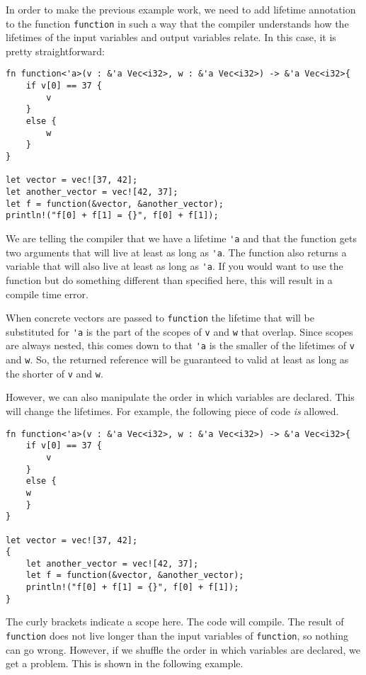 In order to make the previous example work, we need to add lifetime annotation to the function \verb|function| in such a way that the compiler understands how the lifetimes of the input variables and output variables relate. In this case, it is pretty straightforward: 

\begin{verbatim}
fn function<'a>(v : &'a Vec<i32>, w : &'a Vec<i32>) -> &'a Vec<i32>{
    if v[0] == 37 {
        v
    }
    else {
        w
    }
}

let vector = vec![37, 42];
let another_vector = vec![42, 37];
let f = function(&vector, &another_vector);
println!("f[0] + f[1] = {}", f[0] + f[1]);
\end{verbatim}

We are telling the compiler that we have a lifetime \verb|'a| and that the function gets two arguments that will live at least as long as \verb|'a|. The function also returns a variable that will also live at least as long as \verb|'a|. If you would want to use the function but do something different than specified here, this will result in a compile time error. 

When concrete vectors are passed to \verb|function| the lifetime that will be substituted for \verb|'a| is the part of the scopes of \verb|v| and \verb|w| that overlap. Since scopes are always nested, this comes down to that \verb|'a| is the smaller of the lifetimes of \verb|v| and \verb|w|. So, the returned reference will be guaranteed to valid at least as long as the shorter of \verb|v| and \verb|w|.

However, we can also manipulate the order in which variables are declared. This will change the lifetimes. 
For example, the following piece of code \emph{is} allowed.

\begin{verbatim}
fn function<'a>(v : &'a Vec<i32>, w : &'a Vec<i32>) -> &'a Vec<i32>{
    if v[0] == 37 {
        v
    }
    else {
    w
    }
}

let vector = vec![37, 42];
{
    let another_vector = vec![42, 37];
    let f = function(&vector, &another_vector);
    println!("f[0] + f[1] = {}", f[0] + f[1]);
}
\end{verbatim}
The curly brackets indicate a scope here. The code will compile. The result of \verb|function| does not live longer than the input variables of \verb|function|, so nothing can go wrong. However, if we shuffle the order in which variables are declared, we get a problem. This is shown in the following example.

